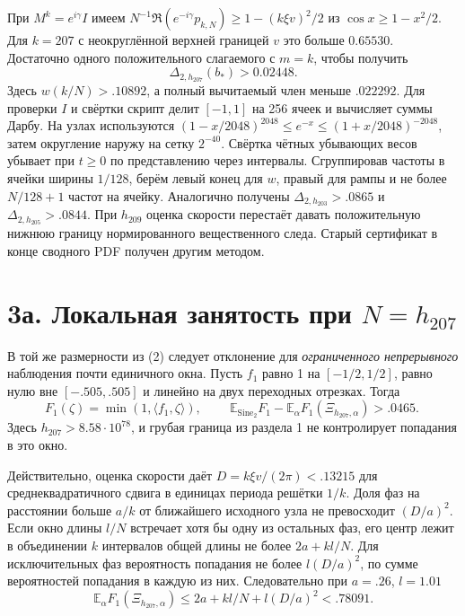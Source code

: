 \documentclass[11pt,a4paper]{article}
\newcommand{\EE}{\mathbb E}
\newcommand{\si}{\mathrm{Sine}_2}
\newcommand{\sect}[1]{\section*{\sffamily\color{ink}#1}}
\begin{document}
При $M^k=e^{i\gamma}I$ имеем
$N^{-1}\Re(e^{-i\gamma}p_{k,N})\ge1-(k\xi v)^2/2$ из $\cos x\ge1-x^2/2$. Для $k=207$ с неокруглённой верхней границей $v$ это больше $0.65530$. Достаточно одного положительного слагаемого с $m=k$, чтобы получить
\[
             \Delta_{2,h_{207}}(b_*)>0.02448 .
\]
Здесь $w(k/N)>.10892$, а полный вычитаемый член меньше $.022292$. Для проверки $I$ и свёртки скрипт делит $[-1,1]$ на 256 ячеек и вычисляет суммы Дарбу. На узлах используются $(1-x/2048)^{2048}\le e^{-x}\le(1+x/2048)^{-2048}$, затем округление наружу на сетку $2^{-40}$. Свёртка чётных убывающих весов убывает при $t\ge0$ по представлению через интервалы. Сгруппировав частоты в ячейки ширины $1/128$, берём левый конец для $w$, правый для рампы и не более $N/128+1$ частот на ячейку. Аналогично получены $\Delta_{2,h_{203}}>.0865$ и $\Delta_{2,h_{205}}>.0844$. При $h_{209}$ оценка скорости перестаёт давать положительную нижнюю границу нормированного вещественного следа. Старый сертификат в конце сводного PDF получен другим методом.
\newpage
\sect{3а. Локальная занятость при $N=h_{207}$}
В той же размерности из (2) следует отклонение для \emph{ограниченного непрерывного} наблюдения почти единичного окна. Пусть $f_1$ равно 1 на $[-1/2,1/2]$, равно нулю вне $[-.505,.505]$ и линейно на двух переходных отрезках. Тогда
\[
 F_1(\zeta)=\min(1,\langle f_1,\zeta\rangle),\qquad
 \boxed{\ \EE_{\si}F_1-\EE_\alpha F_1(\Xi_{h_{207},\alpha})>.0465 .\ }     \tag{2а}
\]
Здесь $h_{207}>8.58\cdot10^{78}$, и грубая граница из раздела 1 не контролирует попадания в это окно.

Действительно, оценка скорости даёт $D=k\xi v/(2\pi)<.13215$ для среднеквадратичного сдвига в единицах периода решётки $1/k$. Доля фаз на расстоянии больше $a/k$ от ближайшего исходного узла не превосходит $(D/a)^2$. Если окно длины $l/N$ встречает хотя бы одну из остальных фаз, его центр лежит в объединении $k$ интервалов общей длины не более $2a+kl/N$. Для исключительных фаз вероятность попадания не более $l(D/a)^2$, по сумме вероятностей попадания в каждую из них. Следовательно при $a=.26$, $l=1.01$
\[
 \EE_\alpha F_1(\Xi_{h_{207},\alpha})\le 2a+kl/N+l(D/a)^2<.78091.
\]
\end{document}
